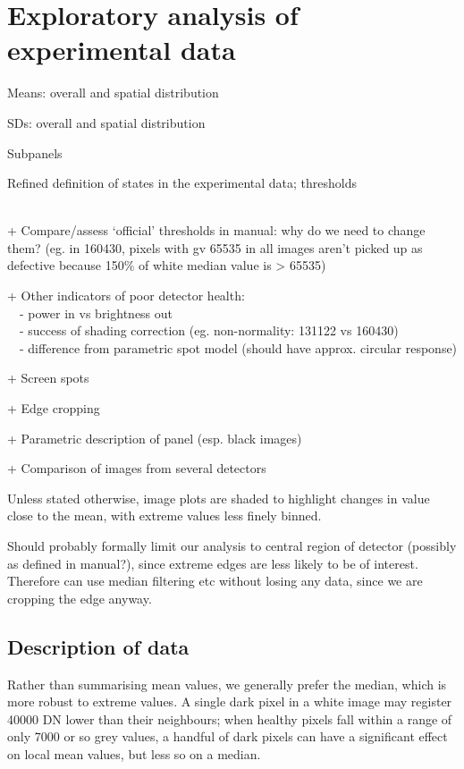\documentclass[\main/IO-Pixels.tex]{subfiles}
\begin{document}
\section{Exploratory analysis of experimental data}
\begin{outline}
Means: overall and spatial distribution

SDs: overall and spatial distribution

Subpanels

Refined definition of states in the experimental data; thresholds

\\
+ Compare/assess `official' thresholds in manual: why do we need to change them? (eg. in 160430, pixels with gv 65535 in all images aren't picked up as defective because 150\% of white median value is > 65535) 

+ Other indicators of poor detector health: \\ \-\  \-\ - power in vs brightness out \\ \-\  \-\ - success of shading correction (eg. non-normality: 131122 vs 160430) \\\-\  \-\ - difference from parametric spot model (should have approx. circular response)

+ Screen spots

+ Edge cropping

+ Parametric description of panel (esp. black images)

+ Comparison of images from several detectors
\end{outline}
Unless stated otherwise, image plots are shaded to highlight changes in value close to the mean, with extreme values less finely binned.

Should probably formally limit our analysis to central region of detector (possibly as defined in manual?), since extreme edges are less likely to be of interest. Therefore can use median filtering etc without losing any data, since we are cropping the edge anyway.


\subsection{Description of data}

Rather than summarising mean values, we generally prefer the median, which is more robust to extreme values. A single dark pixel in a white image may register 40000 DN lower than their neighbours; when healthy pixels fall within a range of only 7000 or so grey values, a handful of dark pixels can have a significant effect on local mean values, but less so on a median.
\end{document}
